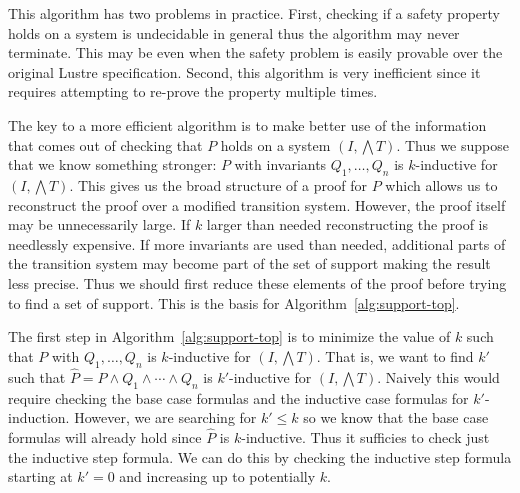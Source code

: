 This algorithm has two problems in practice. First, checking if a
safety property holds on a system is undecidable in general thus the
algorithm may never terminate. This may be even when the safety
problem is easily provable over the original Lustre specification.
Second, this algorithm is very inefficient since it requires
attempting to re-prove the property multiple times.

The key to a more efficient algorithm is to make better use of the
information that comes out of checking that $P$ holds on a system $(I,
\bigwedge T)$. Thus we suppose that we know something stronger: $P$
with invariants $Q_1, \ldots, Q_n$ is $k$-inductive for $(I, \bigwedge
T)$. This gives us the broad structure of a proof for $P$ which allows
us to reconstruct the proof over a modified transition system.
However, the proof itself may be unnecessarily large. If $k$ larger
than needed reconstructing the proof is needlessly expensive. If more
invariants are used than needed, additional parts of the transition system
may become part of the set of support making the result less precise.
Thus we should first reduce these elements of the proof before trying
to find a set of support. This is the basis for
Algorithm~\ref{alg:support-top}.


The first step in Algorithm~\ref{alg:support-top} is to minimize the
value of $k$ such that $P$ with $Q_1, \ldots, Q_n$ is $k$-inductive
for $(I, \bigwedge T)$. That is, we want to find $k'$ such that
$ = P \land Q_1 \land \cdots \land Q_n$ is $k'$-inductive
for $(I, \bigwedge T)$. Naively this would require checking the base
case formulas and the inductive case formulas for $k'$-induction.
However, we are searching for $k' \leq k$ so we know that the base
case formulas will already hold since $$ is $k$-inductive.
Thus it sufficies to check just the inductive step formula. We can do
this by checking the inductive step formula starting at $k' = 0$ and
increasing up to potentially $k$.

